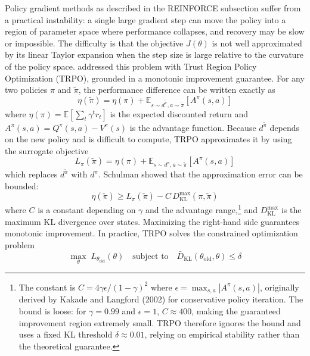 Policy gradient methods as described in the REINFORCE subsection suffer from a practical instability: a single large gradient step can move the policy into a region of parameter space where performance collapses, and recovery may be slow or impossible. The difficulty is that the objective $J(\theta)$ is not well approximated by its linear Taylor expansion when the step size is large relative to the curvature of the policy space. \citet{Schulman2015} addressed this problem with Trust Region Policy Optimization (TRPO), grounded in a monotonic improvement guarantee. For any two policies $\pi$ and $\tilde{\pi}$, the performance difference can be written exactly as
\begin{equation}
\eta(\tilde{\pi}) = \eta(\pi) + \mathbb{E}_{s \sim d^{\tilde{\pi}}, a \sim \tilde{\pi}} \left[ A^\pi(s,a) \right]
\end{equation}
where $\eta(\pi) = \mathbb{E}[\sum_t \gamma^t r_t]$ is the expected discounted return and $A^\pi(s,a) = Q^\pi(s,a) - V^\pi(s)$ is the advantage function. Because $d^{\tilde{\pi}}$ depends on the new policy and is difficult to compute, TRPO approximates it by using the surrogate objective
\begin{equation}
L_\pi(\tilde{\pi}) = \eta(\pi) + \mathbb{E}_{s \sim d^\pi, a \sim \tilde{\pi}} \left[ A^\pi(s,a) \right]
\end{equation}
which replaces $d^{\tilde{\pi}}$ with $d^\pi$. Schulman showed that the approximation error can be bounded:
\begin{equation}
\eta(\tilde{\pi}) \geq L_\pi(\tilde{\pi}) - C \, D_{\mathrm{KL}}^{\max}(\pi, \tilde{\pi})
\end{equation}
where $C$ is a constant depending on $\gamma$ and the advantage range,\footnote{The constant is $C = 4\gamma\epsilon / (1-\gamma)^2$ where $\epsilon = \max_{s,a} |A^\pi(s,a)|$, originally derived by Kakade and Langford (2002) for conservative policy iteration. The bound is loose: for $\gamma = 0.99$ and $\epsilon = 1$, $C \approx 400$, making the guaranteed improvement region extremely small. TRPO therefore ignores the bound and uses a fixed KL threshold $\delta \approx 0.01$, relying on empirical stability rather than the theoretical guarantee.} and $D_{\mathrm{KL}}^{\max}$ is the maximum KL divergence over states. Maximizing the right-hand side guarantees monotonic improvement. In practice, TRPO solves the constrained optimization problem
\begin{equation}
\max_\theta \; L_{\theta_{\text{old}}}(\theta) \quad \text{subject to} \quad \bar{D}_{\mathrm{KL}}(\theta_{\text{old}}, \theta) \leq \delta
\end{equation}
